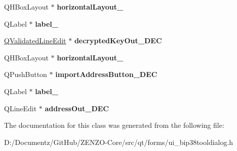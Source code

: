 \begin{DoxyCompactItemize}
\item 
\mbox{\label{class_ui___bip38_tool_dialog_a86c0806a38a3752683b5955773a4e8e5}} 
Q\+H\+Box\+Layout $\ast$ {\bfseries horizontal\+Layout\+\_}
\item 
\mbox{\label{class_ui___bip38_tool_dialog_a52ee5226d6a614ab0b1ac356847f390c}} 
Q\+Label $\ast$ {\bfseries label\+\_}
\item 
\mbox{\label{class_ui___bip38_tool_dialog_af05b85923ab3729ca218508d50c0040f}} 
\mbox{\hyperlink{class_q_validated_line_edit}{Q\+Validated\+Line\+Edit}} $\ast$ {\bfseries decrypted\+Key\+Out\+\_\+\+D\+EC}
\item 
\mbox{\label{class_ui___bip38_tool_dialog_ab2c5b36b7d9059f6336aad256043561e}} 
Q\+H\+Box\+Layout $\ast$ {\bfseries horizontal\+Layout\+\_}
\item 
\mbox{\label{class_ui___bip38_tool_dialog_a8c8237143bbd1b289cb9b7419928cee6}} 
Q\+Push\+Button $\ast$ {\bfseries import\+Address\+Button\+\_\+\+D\+EC}
\item 
\mbox{\label{class_ui___bip38_tool_dialog_a7ca9c673fa5be55bb62a01c7342b2e13}} 
Q\+Label $\ast$ {\bfseries label\+\_}
\item 
\mbox{\label{class_ui___bip38_tool_dialog_a8560164a5cc9011a6a014ac9456e23c2}} 
Q\+Line\+Edit $\ast$ {\bfseries address\+Out\+\_\+\+D\+EC}
\end{DoxyCompactItemize}


The documentation for this class was generated from the following file\+:\begin{DoxyCompactItemize}
\item 
D\+:/\+Documentz/\+Git\+Hub/\+Z\+E\+N\+Z\+O-\/\+Core/src/qt/forms/ui\+\_\+bip38tooldialog.\+h\end{DoxyCompactItemize}
